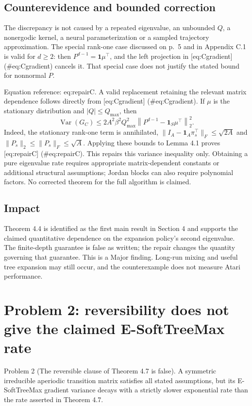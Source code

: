 \documentclass[10pt]{article}
\begin{document}
\subsection*{Counterevidence and bounded correction}
The discrepancy is not caused by a repeated eigenvalue, an unbounded \(Q\), a nonergodic kernel, a neural parameterization or a sampled trajectory approximation. The special rank-one case discussed on p. 5 and in Appendix C.1 is valid for \(d\ge2\): then \(P^{d-1}=\mathbf{1}\mu^\top\), and the left projection in [eq:Cgradient] (\#eq:Cgradient) cancels it. That special case does not justify the stated bound for nonnormal \(P\).\par
Equation reference: eq:repairC. A valid replacement retaining the relevant matrix dependence follows directly from [eq:Cgradient] (\#eq:Cgradient). If \(\mu\) is the stationary distribution and \(|Q|\le Q_{\max}\), then \[
 \operatorname{Var}(G_C)\le
 2A^2\beta^2 Q_{\max}^2
 \left\|P^{d-1}-\mathbf{1}_S\mu^\top\right\|_2^2.\] Indeed, the stationary rank-one term is annihilated, \(\|I_A-\mathbf{1}_A\pi_s^\top\|_F\le\sqrt{2A}\) and \(\|P_s\|_2\le\|P_s\|_F\le\sqrt A\). Applying these bounds to Lemma 4.1 proves [eq:repairC] (\#eq:repairC). This repairs this variance inequality only. Obtaining a pure eigenvalue rate requires appropriate matrix-dependent constants or additional structural assumptions; Jordan blocks can also require polynomial factors. No corrected theorem for the full algorithm is claimed.\par
\subsection*{Impact}
Theorem 4.4 is identified as the first main result in Section 4 and supports the claimed quantitative dependence on the expansion policy’s second eigenvalue. The finite-depth guarantee is false as written; the repair changes the quantity governing that guarantee. This is a Major finding. Long-run mixing and useful tree expansion may still occur, and the counterexample does not measure Atari performance.\par
\section*{Problem 2: reversibility does not give the claimed E-SoftTreeMax rate}
Problem 2 (The reversible clause of Theorem 4.7 is false).  A symmetric irreducible aperiodic transition matrix satisfies all stated assumptions, but its E-SoftTreeMax gradient variance decays with a strictly slower exponential rate than the rate asserted in Theorem 4.7.\par
\end{document}
